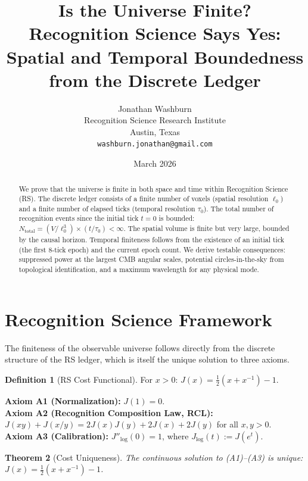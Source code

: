 \documentclass[12pt,a4paper]{article}
\title{Is the Universe Finite?\\
Recognition Science Says Yes: Spatial and Temporal Boundedness\\
from the Discrete Ledger}
\author{Jonathan Washburn\\
Recognition Science Research Institute\\
Austin, Texas\\
\texttt{washburn.jonathan@gmail.com}}
\date{March 2026}
\newtheorem{theorem}{Theorem}[section]
\theoremstyle{definition}
\newtheorem{definition}[theorem]{Definition}
\theoremstyle{remark}
\begin{document}
\maketitle

\begin{abstract}
We prove that the universe is finite in both space and time within
Recognition Science (RS).  The discrete ledger consists of a finite
number of voxels (spatial resolution $\ell_0$) and a finite number
of elapsed ticks (temporal resolution $\tau_0$).  The total number
of recognition events since the initial tick $t = 0$ is bounded:
$N_{\mathrm{total}} = (V/\ell_0^3) \times (t/\tau_0) < \infty$.
The spatial volume is finite but very large, bounded by the causal
horizon.  Temporal finiteness follows from the existence of an
initial tick (the first 8-tick epoch) and the current epoch count.
We derive testable consequences: suppressed power at the largest
CMB angular scales, potential circles-in-the-sky from topological
identification, and a maximum wavelength for any physical mode.
\end{abstract}

\section{Recognition Science Framework}
\label{sec:framework}

The finiteness of the observable universe follows directly from the
discrete structure of the RS ledger, which is itself the unique solution
to three axioms.

\begin{definition}[RS Cost Functional]
For $x > 0$: $J(x) = \tfrac{1}{2}(x + x^{-1}) - 1$.
\end{definition}

\noindent\textbf{Axiom A1 (Normalization):} $J(1) = 0$.\\
\textbf{Axiom A2 (Recognition Composition Law, RCL):}
$J(xy)+J(x/y)=2J(x)J(y)+2J(x)+2J(y)$ for all $x, y > 0$.\\
\textbf{Axiom A3 (Calibration):} $J''_{\log}(0) = 1$, where
$J_{\log}(t) := J(e^t)$.

\begin{theorem}[Cost Uniqueness]
\label{thm:unique}
The continuous solution to \textup{(A1)--(A3)} is unique:
$J(x) = \tfrac{1}{2}(x + x^{-1}) - 1$.
\end{theorem}
\end{document}
